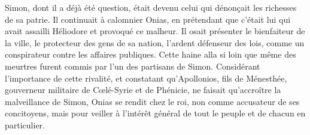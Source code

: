 Simon, dont il a déjà été question,
	était devenu celui qui dénonçait les richesses de sa patrie.
Il continuait à calomnier Onias,
	en prétendant que c’était lui qui avait assailli Héliodore et provoqué ce malheur.
Il osait présenter le bienfaiteur de la ville,
	le protecteur des gens de sa nation, l’ardent défenseur des lois,
	comme un conspirateur contre les affaires publiques.
Cette haine alla si loin
	que même des meurtres furent commis par l’un des partisans de Simon.
Considérant l’importance de cette rivalité,
	et constatant qu’Apollonios, fils de Ménesthée,
		gouverneur militaire de Cœlé-Syrie et de Phénicie,
	ne faisait qu’accroître la malveillance de Simon,
	Onias se rendit chez le roi, non comme accusateur de ses concitoyens,
	mais pour veiller à l’intérêt général de tout le peuple et de chacun en particulier.
